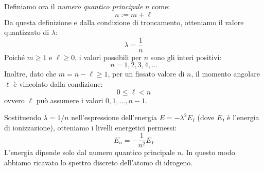 Definiamo ora il \textit{numero quantico principale} \( n \) come:
\begin{equation}
    n := m + \ell
\end{equation}
Da questa definizione e dalla condizione di troncamento, otteniamo il valore quantizzato di \( \lambda \):
\begin{equation}
    \lambda = \frac{1}{n}
\end{equation}
Poiché \( m \ge 1 \) e \( \ell \ge 0 \), i valori possibili per \( n \) sono gli interi positivi:
\begin{equation}
    n = 1, 2, 3, 4, \dots
\end{equation}
Inoltre, dato che \( m = n - \ell \ge 1 \), per un fissato valore di \( n \), il momento angolare \( \ell \) è vincolato dalla condizione:
\begin{equation}
    0 \le \ell < n 
\end{equation}
ovvero \( \ell \) può assumere i valori \( 0, 1, \dots, n-1 \).

Sostituendo \( \lambda = 1/n \) nell'espressione dell'energia \( E = -\lambda^2 E_I \) (dove \( E_I \) è l'energia di ionizzazione), otteniamo i livelli energetici permessi:
\begin{equation}
    E_n = -\frac{1}{n^2} E_I
\end{equation}
L'energia dipende solo dal numero quantico principale \( n \). In questo modo abbiamo ricavato lo spettro discreto dell'atomo di idrogeno.

